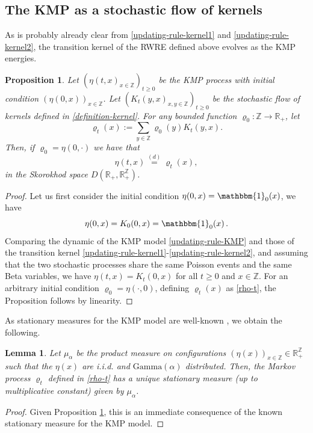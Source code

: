 \documentclass[a4paper,11pt,oneside,reqno]{amsart}
\newtheorem{lemma}[theorem]{Lemma}
\newtheorem{proposition}[theorem]{Proposition}
\theoremstyle{definition}
\newcommand{\R}{\ensuremath{\mathbb{R}}}
\newcommand{\Z}{\ensuremath{\mathbb{Z}}}
\renewcommand{\rho}{\varrho}
\renewcommand{\geq}{\geqslant}
\numberwithin{equation}{section}
\begin{document}
\subsection{The KMP as a stochastic flow of kernels}\label{section-KMP-SFK}
As is probably already clear from \eqref{updating-rule-kernel1} and \eqref{updating-rule-kernel2}, the transition kernel of the RWRE defined above evolves as the KMP energies. 
\begin{proposition}\label{Proposition-KMP-SFK}
	Let $\left(\eta(t,x)_{x\in \mathbb{Z}}\right)_{t\geq 0}$
be the KMP process with initial condition $\left(\eta(0,x)\right)_{x\in \mathbb{Z}}$.
	Let $\left(K_{t}(y,x)_{x,y\in \mathbb{Z}}\right)_{t\geq 0}$ be the stochastic flow of kernels defined in \eqref{definition-kernel}. For any bounded function $\rho_0:\mathbb{Z}\to \mathbb{R}_{+}$, let 
    \begin{equation}\label{rho-t}
 \rho_{t}(x):=\sum_{y\in \mathbb{Z}}\rho_{0}(y)K_{t}(y,x).
    \end{equation}
	Then, if $\rho_{0}=\eta(0, \cdot)$ we have that 
	\begin{equation*}
		\eta(t,x)\overset{(d)}{=}\rho_{t}(x), 
	\end{equation*}
	 in the Skorokhod space $D\left(\mathbb{R}_{+},\mathbb{R}_{+}^{\mathbb{Z}}\right)$.
\end{proposition}
\begin{proof}
	Let us first consider the initial condition $\eta(0,x)=\mathbbm{1}_{0}(x)$, we have 
	\begin{equation*}
		\eta(0,x)=K_{0}(0,x)=\mathbbm{1}_{0}(x)\,.
	\end{equation*}
	Comparing the dynamic of the KMP model \eqref{updating-rule-KMP} and those of  the transition kernel  \eqref{updating-rule-kernel1}-\eqref{updating-rule-kernel2}, and assuming that the two stochastic processes share the same Poisson events and the same Beta variables, we have $\eta(t,x)= K_{t}(0,x)$ for all $t\geq 0$ and $x\in \mathbb Z$. 
	For an arbitrary initial condition $\rho_{0}=\eta(\cdot,0)$, defining $\rho_{t}(x)$ as \eqref{rho-t}, the Proposition follows by linearity. 
\end{proof}
As stationary measures for the KMP model are well-known \cite{kipnis1982heat,modelsOfTransport}, we obtain the following. 
\begin{lemma}\label{Lemma-invariantMeasure-K}
	Let $\mu_{\alpha}$ be the product measure on configurations  $(\eta(x))_{x\in \Z} \in \R_+^{\Z}$ such that the $\eta(x)$ are i.i.d. and  $\mathrm{Gamma}(\alpha)$ distributed. Then, the Markov process $\rho_t$ defined in \eqref{rho-t} has a unique stationary measure (up to multiplicative constant) given by $\mu_{\alpha}$. 
\end{lemma}
\begin{proof}
Given Proposition \ref{Proposition-KMP-SFK}, this is an immediate consequence of the known stationary measure for the KMP model. 
\end{proof}
\end{document}
